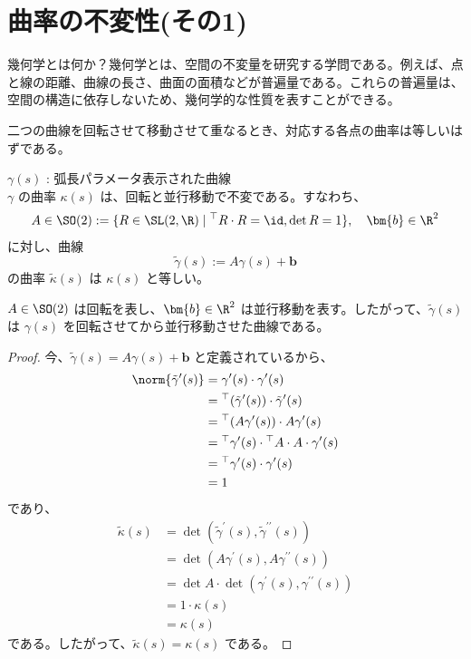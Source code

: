 \documentclass[article,paper=a4paper]{jlreq}
\begin{document}

\section{曲率の不変性(その1)}

幾何学とは何か？幾何学とは、空間の不変量を研究する学問である。例えば、点と線の距離、曲線の長さ、曲面の面積などが普遍量である。これらの普遍量は、空間の構造に依存しないため、幾何学的な性質を表すことができる。

\begin{ex}
    二つの曲線を回転させて移動させて重なるとき、対応する各点の曲率は等しいはずである。
\end{ex}

\begin{thm}
    \quad $\gamma(s)$ : 弧長パラメータ表示された曲線\\
    $\gamma$ の曲率 $\kappa(s)$ は、回転と並行移動で不変である。すなわち、
    \[A\in \SO(2) := \{R \in \SL(2,\R) \mid {}^\top R\cdot R = \id, \det R = 1\}, \quad \bm{b} \in \R^2\]
    に対し、曲線
\[\tilde{\gamma}(s) := A\gamma(s) + \bm{b}\]
の曲率 $\tilde{\kappa}(s)$ は $\kappa(s)$ と等しい。
\end{thm}

\begin{rem}
    $ A \in \SO(2)$ は回転を表し、$\bm{b} \in \R^2$ は並行移動を表す。したがって、$\tilde{\gamma}(s)$ は $\gamma(s)$ を回転させてから並行移動させた曲線である。
\end{rem}

\begin{proof}
    今、$\tilde{\gamma}(s) = A\gamma(s) + \bm{b}$ と定義されているから、
    \begin{align*}
    \norm{\tilde{\gamma}^{\prime}(s)} &= \gamma^{\prime}(s)\cdot \gamma^{\prime}(s) \\
    &= {}^\top(\tilde{\gamma}^{\prime}(s)) \cdot \tilde{\gamma}^{\prime}(s) \\
    &= {}^\top(A\gamma^{\prime}(s)) \cdot A\gamma^{\prime}(s) \\
    &= {}^\top \gamma^{\prime}(s) \cdot {}^\top A \cdot A \cdot \gamma^{\prime}(s) \\
    &= {}^\top \gamma^{\prime}(s) \cdot \gamma^{\prime}(s) \\
    &= 1
    \end{align*}
    であり、
    \begin{align*}
        \tilde{\kappa}(s) &= \det(\tilde{\gamma}^{\prime}(s), \tilde{\gamma}^{\prime\prime}(s)) \\
        &= \det(A\gamma^{\prime}(s), A\gamma^{\prime\prime}(s)) \\
        &= \det A \cdot \det(\gamma^{\prime}(s), \gamma^{\prime\prime}(s)) \\
        &= 1 \cdot \kappa(s) \\
        &= \kappa(s)
    \end{align*}
    である。したがって、$\tilde{\kappa}(s) = \kappa(s)$ である。
\end{proof}
\end{document}
